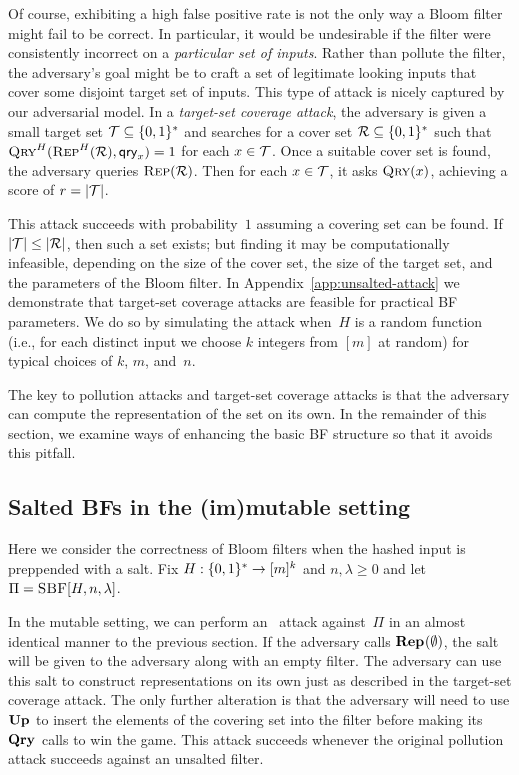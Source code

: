 %
Of course, exhibiting a high false positive rate is not the only way a Bloom
filter might fail to be correct. In particular, it would be undesirable if the
filter were consistently incorrect on a \emph{particular set of inputs}. Rather
than pollute the filter, the adversary's goal might be to craft a set of
legitimate looking inputs that cover some disjoint target set of inputs.
%
This type of attack is nicely captured by our adversarial model.
%
In a \emph{target-set coverage attack}, the adversary is given a small target set
$\mathcal{T}\subseteq\{0,1\}^*$ and searches for a cover set $\mathcal{R}\subseteq\{0,1\}^*$
such that $\textnormal{\textsc{Qry}}^H(\textnormal{\textsc{Rep}}^H(\mathcal{R}),\mathsf{qry}_x)=1$ for each $x\in\mathcal{T}$.
%
Once a suitable cover set is found, the adversary queries $\textnormal{\textsc{Rep}}(\mathcal{R})$. Then
for each $x\in\mathcal{T}$, it asks $\textnormal{\textsc{Qry}}(x)$, achieving a score of $r = |\mathcal{T}|$.

This  attack succeeds with probability~$1$ assuming a covering set can
be found.  If $|\mathcal{T}| \leq |\mathcal{R}|$, then such a set exists; but finding it may be
computationally infeasible, depending on the size of the cover set, the size of
the target set, and the parameters of the Bloom filter.
%
In Appendix~\ref{app:unsalted-attack} we demonstrate that target-set coverage
attacks are feasible for practical BF parameters. We do so by simulating the
attack when~$H$ is a random function (i.e., for each distinct input we choose
$k$ integers from $[m]$ at random) for typical choices of $k$, $m$, and~$n$.

The key to pollution attacks and target-set coverage attacks is that the
adversary can compute the representation of the set on its own. In the remainder
of this section, we examine ways of enhancing the basic BF structure so that it
avoids this pitfall.

\subsection{Salted BFs in the (im)mutable setting}
%
Here we consider the correctness of Bloom filters when the hashed input is
preppended with a salt.
%
Fix $H:\{0,1\}^*\to[m]^k$ and $n,\lambda\geq0$ and let
$\Pi = \textnormal{\textsc{SBF}}[H,n,\lambda]$.

In the mutable setting, we can perform an \errep\ attack against~$\Pi$ in an
almost identical manner to the previous section. If the adversary calls
$\textup{\textbf{Rep}}\hspace{0.5pt}(\emptyset)$, the salt will be given to the adversary along with an empty
filter. The adversary can use this salt to construct representations on its own
just as described in the target-set coverage attack. The only further alteration
is that the adversary will need to use $\textup{\textbf{Up}}\hspace{0.5pt}$ to insert the elements of the
covering set into the filter before making its $\textup{\textbf{Qry}}\hspace{0.5pt}$ calls to win the game.
This attack succeeds whenever the original pollution attack succeeds against an
unsalted filter.

